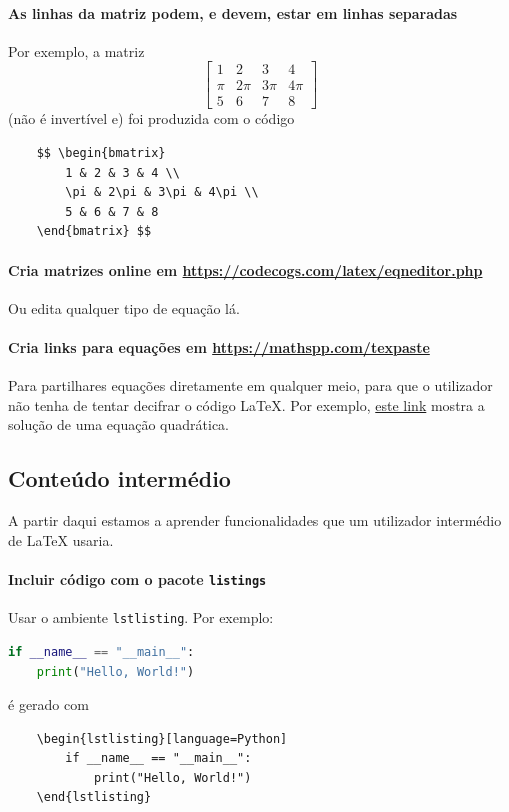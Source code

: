 \documentclass[11pt]{article}
\begin{document}
\paragraph{As linhas da matriz podem, e devem, estar em linhas separadas}
Por exemplo, a matriz
$$ \begin{bmatrix}
    1 & 2 & 3 & 4 \\
    \pi & 2\pi & 3\pi & 4\pi \\
    5 & 6 & 7 & 8
\end{bmatrix} $$
(não é invertível e) foi produzida com o código
\begin{verbatim}
    $$ \begin{bmatrix}
        1 & 2 & 3 & 4 \\
        \pi & 2\pi & 3\pi & 4\pi \\
        5 & 6 & 7 & 8
    \end{bmatrix} $$
\end{verbatim}

\paragraph{Cria matrizes online em \url{https://codecogs.com/latex/eqneditor.php}}
Ou edita qualquer tipo de equação lá.

\paragraph{Cria links para equações em \url{https://mathspp.com/texpaste}}
Para partilhares equações diretamente em qualquer meio,
para que o utilizador não tenha de tentar decifrar o código LaTeX.
Por exemplo, \href{https://mathspp.com/texpaste\#0U1GpULBViEkrSkyu1k1SiCnIVYgpLiwqqU6KM1LQVTBJTK6trTZKrFVRAQA}
{este link} mostra a solução de uma equação quadrática.

\subsection{Conteúdo intermédio}
A partir daqui estamos a aprender funcionalidades que um utilizador intermédio
de LaTeX usaria.

\paragraph{Incluir código com o pacote \texttt{listings}}
Usar o ambiente \texttt{lstlisting}. Por exemplo:
\begin{lstlisting}[language=Python]
if __name__ == "__main__":
    print("Hello, World!")
\end{lstlisting}
é gerado com
\begin{verbatim}
    \begin{lstlisting}[language=Python]
        if __name__ == "__main__":
            print("Hello, World!")
    \end{lstlisting}
\end{verbatim}
\end{document}

